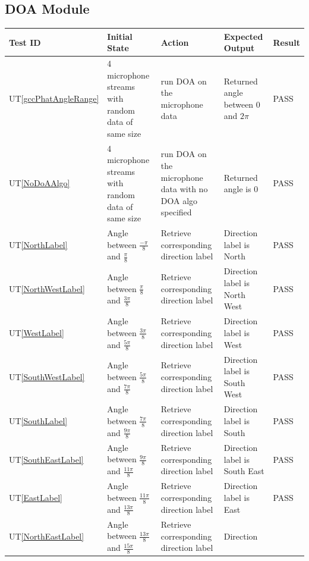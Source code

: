 \documentclass[12pt, titlepage]{article}
\newcommand{\utref}[1]{UT\ref{#1}}
\begin{document}
\subsection{DOA Module}
{\footnotesize
\begin{longtable}{|p{0.8cm}|p{3.5cm}|p{3.5cm}|p{3.5cm}|p{1cm}|}
    \hline
    \textbf{Test ID} & \textbf{Initial State} & \textbf{Action} &
    \textbf{Expected Output} & \textbf{Result} \\ 
    \endfirsthead
    \hline

    \utref{gccPhatAngleRange} & 4 microphone streams with random data of same
    size & run DOA on the microphone data  & Returned angle between 0 and $2\pi$
    & PASS\\ \hline
    \utref{NoDoAAlgo} & 4 microphone streams with random data of same size & run
    DOA on the microphone data with no DOA algo specified  & Returned angle is 0
    & PASS\\ \hline
    \utref{NorthLabel} & Angle between $\frac{-\pi}{8}$ and $\frac{\pi}{8}$ &
    Retrieve corresponding direction label  & Direction label is North & PASS\\
    \hline
    \utref{NorthWestLabel} & Angle between $\frac{\pi}{8}$ and $\frac{3\pi}{8}$
    & Retrieve corresponding direction label  & Direction label is North West &
    PASS\\ \hline
    \utref{WestLabel} & Angle between $\frac{3\pi}{8}$ and $\frac{5\pi}{8}$ &
    Retrieve corresponding direction label  & Direction label is West & PASS\\
    \hline
    \utref{SouthWestLabel} & Angle between $\frac{5\pi}{8}$ and $\frac{7\pi}{8}$
    & Retrieve corresponding direction label  & Direction label is South West &
    PASS\\ \hline
    \utref{SouthLabel} & Angle between $\frac{7\pi}{8}$ and $\frac{9\pi}{8}$ &
    Retrieve corresponding direction label  & Direction label is South & PASS\\
    \hline
    \utref{SouthEastLabel} & Angle between $\frac{9\pi}{8}$ and
    $\frac{11\pi}{8}$ & Retrieve corresponding direction label  & Direction
    label is South East & PASS\\ \hline
    \utref{EastLabel} & Angle between $\frac{11\pi}{8}$ and $\frac{13\pi}{8}$ &
    Retrieve corresponding direction label  & Direction label is East & PASS\\
    \hline
    \utref{NorthEastLabel} & Angle between $\frac{13\pi}{8}$ and
    $\frac{15\pi}{8}$ & Retrieve corresponding direction label  & Direction

\end{longtable}}
\end{document}
